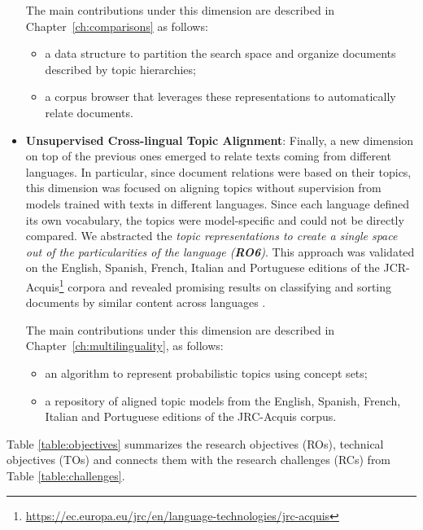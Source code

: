 \begin{itemize}
The main contributions under this dimension are described in Chapter~\ref{ch:comparisons} as follows:
\begin{itemize}
\item a data structure to partition the search space and organize documents described by topic hierarchies;
\item a corpus browser that leverages these representations to automatically relate documents.
\end{itemize} 
\item \textbf{Unsupervised Cross-lingual Topic Alignment}: Finally, a new dimension on top of the previous ones emerged to relate texts coming from different languages. In particular, since document relations were based on their topics, this dimension was focused on aligning topics without supervision from models trained with texts in different languages. Since each language defined its own vocabulary, the topics were model-specific and could not be directly compared. We abstracted the \textit{topic representations to create a single space out of the particularities of the language (\textbf{RO6})}. This approach was validated on the English, Spanish, French, Italian and Portuguese editions of the JCR-Acquis\footnote{\url{https://ec.europa.eu/jrc/en/language-technologies/jrc-acquis}} corpora and revealed promising results on classifying and sorting documents by similar content across languages \citep{Badenes-Olmedo2019, Badenes-Olmedo2019b}. 

The main contributions under this dimension are described in Chapter~\ref{ch:multilinguality}, as follows: 
\begin{itemize}
\item an algorithm to represent probabilistic topics using concept sets;
\item a repository of aligned topic models from the English, Spanish, French, Italian and Portuguese editions of the JRC-Acquis corpus.
\end{itemize}
\end{itemize}








Table \ref{table:objectives} summarizes the research objectives (ROs), technical objectives (TOs) and connects them with the research challenges (RCs) from Table \ref{table:challenges}.



